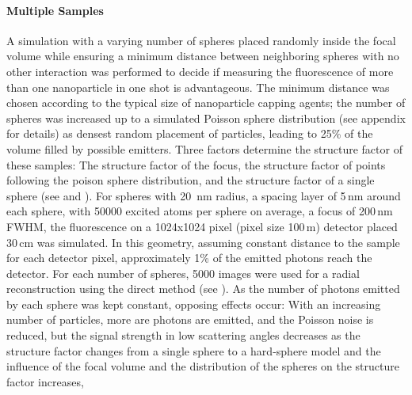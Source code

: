 



\paragraph{Multiple Samples}

A simulation with a varying number of spheres placed randomly inside the focal volume while ensuring a minimum distance between neighboring spheres with no other interaction was performed to decide if measuring the fluorescence of more than one nanoparticle in one shot is advantageous.
The minimum distance was chosen according to the typical size of nanoparticle capping agents; the number of spheres was increased up to a simulated Poisson sphere distribution (see appendix  for details) as densest random placement of particles, leading to 25\% of the volume filled by possible emitters.
Three factors determine the structure factor of these samples: The structure factor of the focus, the structure factor of points following the poison sphere distribution, and the structure factor of a single sphere (see  and ). 
For spheres with 20\, nm radius, a spacing layer of 5\,nm around each sphere, with  50000 excited atoms per sphere on average, a focus of 200\,nm FWHM, the fluorescence on a 1024x1024 pixel (pixel size 100\,\textmu m) detector placed 30\,cm was simulated. In this geometry, assuming constant distance to the sample for each detector pixel, approximately 1\% of the emitted photons reach the detector.  For each number of spheres, 5000 images were used for a radial reconstruction using the direct method (see ).
As the number of photons emitted by each sphere was kept constant, opposing effects occur:  With an increasing number of particles, more are photons are emitted, and the Poisson noise is reduced, but the signal strength in low scattering angles decreases as the structure factor changes from a single sphere to a hard-sphere model and the influence of the focal volume and the distribution of the spheres on the structure factor increases, 


